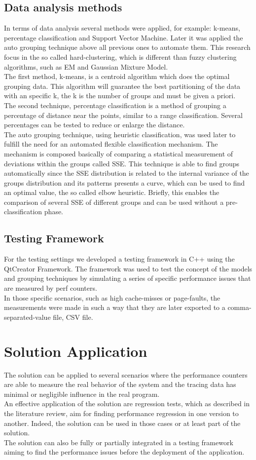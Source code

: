 \subsection{Data analysis methods}
In terms of data analysis several methods were applied, for example: k-means, percentage classification and Support Vector Machine. Later it was applied the auto grouping technique above all previous ones to automate them. This research focus in the so called hard-clustering, which is different than fuzzy clustering algorithms, such as EM and Gaussian Mixture Model.\\
The first method, k-means, is a centroid algorithm which does the optimal grouping data. This algorithm will guarantee the best partitioning of the data with an specific k, the k is the number of groups and must be given a priori.\\
The second technique, percentage classification is a method of grouping a percentage of distance near the points, similar to a range classification. Several percentages can be tested to reduce or enlarge the distance.\\
The auto grouping technique, using heuristic classification, was used later to fulfill the need for an automated flexible classification mechanism. The mechanism is composed basically of comparing a statistical measurement of deviations within the groups called SSE. This technique is able to find groups automatically since the SSE distribution is related to the internal variance of the groups distribution and its patterns presents a curve, which can be used to find an optimal value, the so called elbow heuristic. Briefly, this enables the comparison of several SSE of different groups and can be used without a pre-classification phase.
\subsection{Testing Framework}
For the testing settings we developed a testing framework in C++ using the QtCreator Framework. The framework was used to test the concept of the models and grouping techniques by simulating a series of specific performance issues that are measured by perf counters.\\
In those specific scenarios, such as high cache-misses or page-faults, the measurements were made in such a way that they are later exported to a comma-separated-value file, CSV file.
\section{Solution Application}
The solution can be applied to several scenarios where the performance counters are able to measure the real behavior of the system and the tracing data has minimal or negligible influence in the real program.\\
An effective application of the solution are regression tests, which as described in the literature review, aim for finding performance regression in one version to another. Indeed, the solution can be used in those cases or at least part of the solution.\\
The solution can also be fully or partially integrated in a testing framework aiming to find the performance issues before the deployment of the application.
